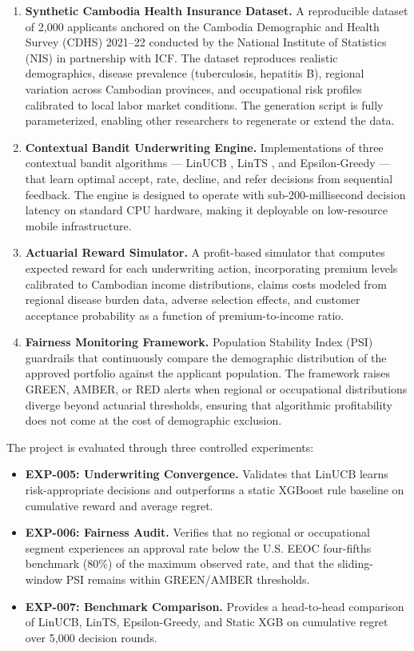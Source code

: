 \begin{enumerate}
\def\labelenumi{\arabic{enumi}.}
\item
  \textbf{Synthetic Cambodia Health Insurance Dataset.} A reproducible dataset of 2,000 applicants anchored on the Cambodia Demographic and Health Survey (CDHS) 2021--22 conducted by the National Institute of Statistics (NIS) in partnership with ICF. The dataset reproduces realistic demographics, disease prevalence (tuberculosis, hepatitis B), regional variation across Cambodian provinces, and occupational risk profiles calibrated to local labor market conditions. The generation script is fully parameterized, enabling other researchers to regenerate or extend the data.
\item
  \textbf{Contextual Bandit Underwriting Engine.} Implementations of three contextual bandit algorithms --- LinUCB \citep{Li2010}, LinTS \citep{Agrawal2013}, and Epsilon-Greedy --- that learn optimal accept, rate, decline, and refer decisions from sequential feedback. The engine is designed to operate with sub-200-millisecond decision latency on standard CPU hardware, making it deployable on low-resource mobile infrastructure.
\item
  \textbf{Actuarial Reward Simulator.} A profit-based simulator that computes expected reward for each underwriting action, incorporating premium levels calibrated to Cambodian income distributions, claims costs modeled from regional disease burden data, adverse selection effects, and customer acceptance probability as a function of premium-to-income ratio.
\item
  \textbf{Fairness Monitoring Framework.} Population Stability Index (PSI) guardrails that continuously compare the demographic distribution of the approved portfolio against the applicant population. The framework raises GREEN, AMBER, or RED alerts when regional or occupational distributions diverge beyond actuarial thresholds, ensuring that algorithmic profitability does not come at the cost of demographic exclusion.
\end{enumerate}

The project is evaluated through three controlled experiments:

\begin{itemize}
\tightlist
\item
  \textbf{EXP-005: Underwriting Convergence.} Validates that LinUCB learns risk-appropriate decisions and outperforms a static XGBoost rule baseline on cumulative reward and average regret.
\item
  \textbf{EXP-006: Fairness Audit.} Verifies that no regional or occupational segment experiences an approval rate below the U.S. EEOC four-fifths benchmark (80\%) of the maximum observed rate, and that the sliding-window PSI remains within GREEN/AMBER thresholds.
\item
  \textbf{EXP-007: Benchmark Comparison.} Provides a head-to-head comparison of LinUCB, LinTS, Epsilon-Greedy, and Static XGB on cumulative regret over 5,000 decision rounds.
\end{itemize}

